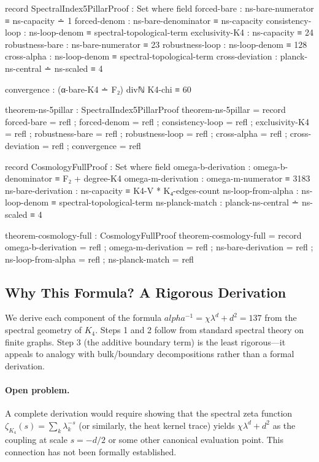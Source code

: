 \documentclass[11pt,a4paper]{book}
\def\alpha{alpha}%
\begin{document}
\begin{code}
record SpectralIndex5PillarProof : Set where
  field
    forced-bare : ns-bare-numerator ≡ ns-capacity ∸ 1
    forced-denom : ns-bare-denominator ≡ ns-capacity
    consistency-loop : ns-loop-denom ≡ spectral-topological-term
    exclusivity-K4 : ns-capacity ≡ 24
    robustness-bare : ns-bare-numerator ≡ 23
    robustness-loop : ns-loop-denom ≡ 128
    cross-alpha : ns-loop-denom ≡ spectral-topological-term
    cross-deviation : planck-ns-central ∸ ns-scaled ≡ 4
    
    convergence : (α-bare-K4 ∸ F₂) divℕ K4-chi ≡ 60

theorem-ns-5pillar : SpectralIndex5PillarProof
theorem-ns-5pillar = record
  { forced-bare = refl
  ; forced-denom = refl
  ; consistency-loop = refl
  ; exclusivity-K4 = refl
  ; robustness-bare = refl
  ; robustness-loop = refl
  ; cross-alpha = refl
  ; cross-deviation = refl
  ; convergence = refl
  }

record CosmologyFullProof : Set where
  field
    omega-b-derivation : omega-b-denominator ≡ F₂ + degree-K4
    omega-m-derivation : omega-m-numerator ≡ 3183
    ns-bare-derivation : ns-capacity ≡ K4-V * K₄-edges-count
    ns-loop-from-alpha : ns-loop-denom ≡ spectral-topological-term
    ns-planck-match    : planck-ns-central ∸ ns-scaled ≡ 4

theorem-cosmology-full : CosmologyFullProof
theorem-cosmology-full = record
  { omega-b-derivation = refl
  ; omega-m-derivation = refl
  ; ns-bare-derivation = refl
  ; ns-loop-from-alpha = refl
  ; ns-planck-match    = refl
  }
\end{code}

\subsection{Why This Formula? A Rigorous Derivation}
\label{sec:alpha-formula-why}

We derive each component of the formula $\alpha^{-1} = \chi \lambda^d + d^2 = 137$
from the spectral geometry of $K_4$. Steps 1 and 2 follow from standard spectral
theory on finite graphs. Step 3 (the additive boundary term) is the least rigorous---it
appeals to analogy with bulk/boundary decompositions rather than a formal derivation.

\paragraph{Open problem.} A complete derivation would require showing that the
spectral zeta function $\zeta_{K_4}(s) = \sum_k \lambda_k^{-s}$ (or similarly, the
heat kernel trace) yields $\chi\lambda^d + d^2$ as the coupling at scale $s = -d/2$
or some other canonical evaluation point. This connection has not been formally
established.
\end{document}
